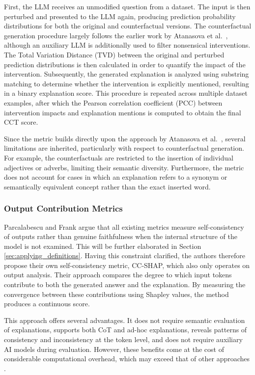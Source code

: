 First, the LLM receives an unmodified question from a dataset. The input is then perturbed and presented to the LLM again, producing prediction probability distributions for both the original and counterfactual versions. The counterfactual generation procedure largely follows the earlier work by Atanasova et al.~\cite{atanasovaFaithfulnessTestsNatural2023}, although an auxiliary LLM is additionally used to filter nonsensical interventions. The Total Variation Distance (TVD) between the original and perturbed prediction distributions is then calculated in order to quantify the impact of the intervention. Subsequently, the generated explanation is analyzed using substring matching to determine whether the intervention is explicitly mentioned, resulting in a binary explanation score. This procedure is repeated across multiple dataset examples, after which the Pearson correlation coefficient (PCC) between intervention impacts and explanation mentions is computed to obtain the final CCT score.

Since the metric builds directly upon the approach by Atanasova et al.~\cite{atanasovaFaithfulnessTestsNatural2023}, several limitations are inherited, particularly with respect to counterfactual generation. For example, the counterfactuals are restricted to the insertion of individual adjectives or adverbs, limiting their semantic diversity. Furthermore, the metric does not account for cases in which an explanation refers to a synonym or semantically equivalent concept rather than the exact inserted word.

\subsubsection{Output Contribution Metrics}
\label{sec:cc_shap}
Parcalabescu and Frank \cite{parcalabescuMeasuringFaithfulnessSelfconsistency2024} argue that all existing metrics measure self-consistency of outputs rather than genuine faithfulness when the internal structure of the model is not examined. This will be further elaborated in Section \ref{sec:applying_definitions}. Having this constraint clarified, the authors therefore propose their own self-consistency metric, CC-SHAP, which also only operates on output analysis. Their approach compares the degree to which input tokens contribute to both the generated answer and the explanation. By measuring the convergence between these contributions using Shapley values, the method produces a continuous score.

This approach offers several advantages. It does not require semantic evaluation of explanations, supports both CoT and ad-hoc explanations, reveals patterns of consistency and inconsistency at the token level, and does not require auxiliary AI models during evaluation. However, these benefits come at the cost of considerable computational overhead, which may exceed that of other approaches \cite{parcalabescuMeasuringFaithfulnessSelfconsistency2024}.

